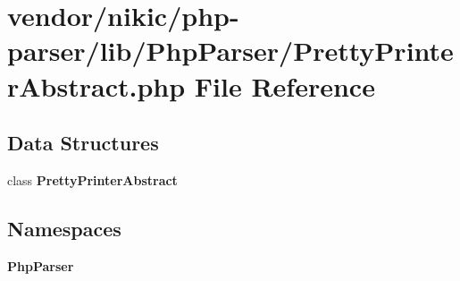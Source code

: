 \section{vendor/nikic/php-\/parser/lib/\+Php\+Parser/\+Pretty\+Printer\+Abstract.php File Reference}
\label{_pretty_printer_abstract_8php}
\subsection*{Data Structures}
\begin{DoxyCompactItemize}
\item 
class {\bf Pretty\+Printer\+Abstract}
\end{DoxyCompactItemize}
\subsection*{Namespaces}
\begin{DoxyCompactItemize}
\item 
 {\bf Php\+Parser}
\end{DoxyCompactItemize}
